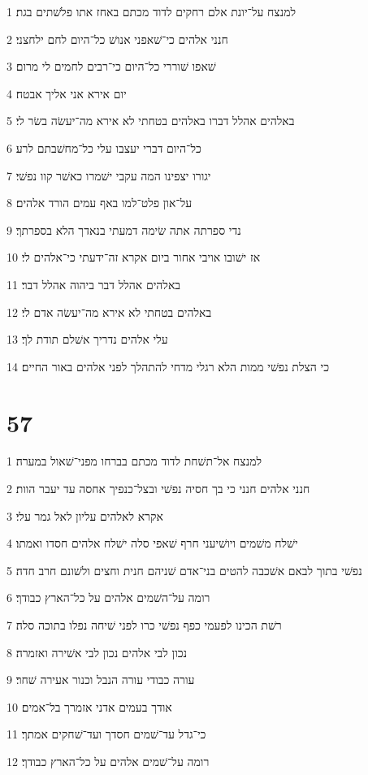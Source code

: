 \par 1 למנצח על־יונת אלם רחקים לדוד מכתם באחז אתו פלשׁתים בגת׃
\par 2 חנני אלהים כי־שׁאפני אנושׁ כל־היום לחם ילחצני׃
\par 3 שׁאפו שׁוררי כל־היום כי־רבים לחמים לי מרום׃
\par 4 יום אירא אני אליך אבטח׃
\par 5 באלהים אהלל דברו באלהים בטחתי לא אירא מה־יעשׂה בשׂר לי׃
\par 6 כל־היום דברי יעצבו עלי כל־מחשׁבתם לרע׃
\par 7 יגורו יצפינו המה עקבי ישׁמרו כאשׁר קוו נפשׁי׃
\par 8 על־און פלט־למו באף עמים הורד אלהים׃
\par 9 נדי ספרתה אתה שׂימה דמעתי בנאדך הלא בספרתך׃
\par 10 אז ישׁובו אויבי אחור ביום אקרא זה־ידעתי כי־אלהים לי׃
\par 11 באלהים אהלל דבר ביהוה אהלל דבר׃
\par 12 באלהים בטחתי לא אירא מה־יעשׂה אדם לי׃
\par 13 עלי אלהים נדריך אשׁלם תודת לך׃
\par 14 כי הצלת נפשׁי ממות הלא רגלי מדחי להתהלך לפני אלהים באור החיים׃

\chapter{57}

\par 1 למנצח אל־תשׁחת לדוד מכתם בברחו מפני־שׁאול במערה׃
\par 2 חנני אלהים חנני כי בך חסיה נפשׁי ובצל־כנפיך אחסה עד יעבר הוות׃
\par 3 אקרא לאלהים עליון לאל גמר עלי׃
\par 4 ישׁלח משׁמים ויושׁיעני חרף שׁאפי סלה ישׁלח אלהים חסדו ואמתו׃
\par 5 נפשׁי בתוך לבאם אשׁכבה להטים בני־אדם שׁניהם חנית וחצים ולשׁונם חרב חדה׃
\par 6 רומה על־השׁמים אלהים על כל־הארץ כבודך׃
\par 7 רשׁת הכינו לפעמי כפף נפשׁי כרו לפני שׁיחה נפלו בתוכה סלה׃
\par 8 נכון לבי אלהים נכון לבי אשׁירה ואזמרה׃
\par 9 עורה כבודי עורה הנבל וכנור אעירה שׁחר׃
\par 10 אודך בעמים אדני אזמרך בל־אמים׃
\par 11 כי־גדל עד־שׁמים חסדך ועד־שׁחקים אמתך׃
\par 12 רומה על־שׁמים אלהים על כל־הארץ כבודך׃


